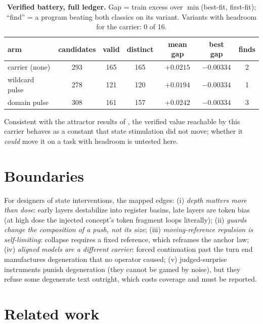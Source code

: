 \documentclass[11pt]{article}
\begin{document}
\begin{table}[t]
\centering\small
\begin{tabular}{lcccccc}
\toprule
arm & candidates & valid & distinct & mean gap & best gap & finds \\
\midrule
carrier (none) & 293 & 165 & 165 & $+0.0215$ & $-0.00334$ & 2 \\
wildcard pulse & 278 & 121 & 120 & $+0.0194$ & $-0.00334$ & 1 \\
domain pulse & 308 & 161 & 157 & $+0.0242$ & $-0.00334$ & 3 \\
\bottomrule
\end{tabular}
\caption{\textbf{Verified battery, full ledger.} Gap = train excess
over $\min$(best-fit, first-fit); ``find'' = a program beating both
classics on its variant. Variants with headroom for the carrier: 0 of
16.}
\label{tab:bconf}
\end{table}

Consistent with the attractor results of \citet{ono2026mass}, the
verified value reachable by this carrier behaves as a constant that
state stimulation did not move; whether it \emph{could} move it on a
task with headroom is untested here.

\section{Boundaries}
\label{sec:boundaries}

For designers of state interventions, the mapped edges: (i) \emph{depth
matters more than dose}: early layers destabilize into register
basins, late layers are token bias (at high dose the injected concept's
token fragment loops literally); (ii) \emph{guards change the composition of a push, not its size}; (iii)
\emph{moving-reference repulsion is self-limiting}: collapse
requires a fixed reference, which reframes the anchor law; (iv)
\emph{aligned models are a different carrier}: forced continuation
past the turn end manufactures degeneration that no operator caused;
(v) judged-surprise instruments punish degeneration (they cannot be
gamed by noise), but they refuse some degenerate text outright, which
costs coverage and must be reported.

\section{Related work}
\label{sec:related}
\end{document}
